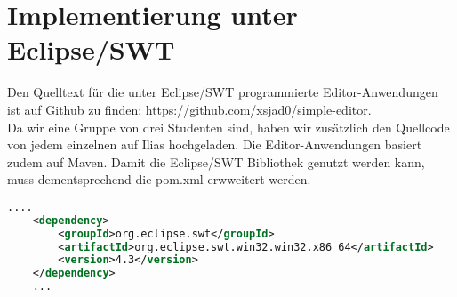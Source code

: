 \section{Implementierung unter Eclipse/SWT}
Den Quelltext für die unter Eclipse/SWT programmierte
Editor-Anwendungen ist auf Github zu finden: \url{https://github.com/xsjad0/simple-editor}.\\
Da wir eine Gruppe von drei Studenten sind, haben wir zusätzlich den Quellcode von jedem einzelnen auf Ilias hochgeladen.
Die Editor-Anwendungen basiert zudem auf Maven. Damit die Eclipse/SWT Bibliothek genutzt
werden kann, muss dementsprechend die pom.xml erwweitert werden.

\begin{lstlisting}[frame=single, language=XML, caption=Maven SWT Abhängigkeit]
    ....
    <dependency>
        <groupId>org.eclipse.swt</groupId>
        <artifactId>org.eclipse.swt.win32.win32.x86_64</artifactId>
        <version>4.3</version>
    </dependency>
    ...
\end{lstlisting}

